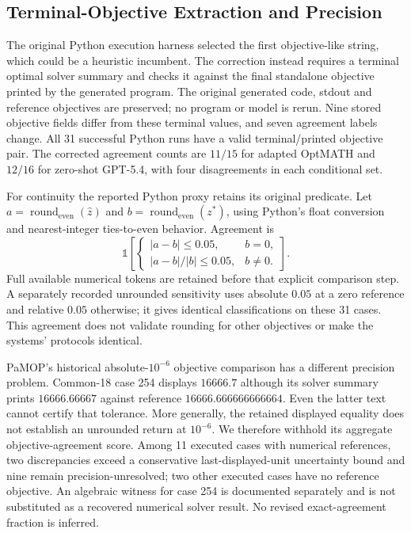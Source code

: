 \subsection{Terminal-Objective Extraction and Precision}
The original Python execution harness selected the first objective-like string, which could be a heuristic incumbent. The correction instead requires a terminal optimal solver summary and checks it against the final standalone objective printed by the generated program. The original generated code, stdout and reference objectives are preserved; no program or model is rerun. Nine stored objective fields differ from these terminal values, and seven agreement labels change. All 31 successful Python runs have a valid terminal/printed objective pair. The corrected agreement counts are $11/15$ for adapted OptMATH and $12/16$ for zero-shot GPT-5.4, with four disagreements in each conditional set.

For continuity the reported Python proxy retains its original predicate. Let $a=\operatorname{round}_{\mathrm{even}}(\hat z)$ and $b=\operatorname{round}_{\mathrm{even}}(z^*)$, using Python's float conversion and nearest-integer ties-to-even behavior. Agreement is
\begin{equation}
 \mathbb{1}\!\left[\begin{cases}|a-b|\leq0.05,&b=0,\\ |a-b|/|b|\leq0.05,&b\ne0.\end{cases}\right].
 \label{eq:common18-objective-proxy}
\end{equation}
Full available numerical tokens are retained before that explicit comparison step. A separately recorded unrounded sensitivity uses absolute $0.05$ at a zero reference and relative $0.05$ otherwise; it gives identical classifications on these 31 cases. This agreement does not validate rounding for other objectives or make the systems' protocols identical.

PaMOP's historical absolute-$10^{-6}$ objective comparison has a different precision problem. Common-18 case 254 displays $16666.7$ although its solver summary prints $16666.66667$ against reference $16666.666666666664$. Even the latter text cannot certify that tolerance. More generally, the retained displayed equality does not establish an unrounded return at $10^{-6}$. We therefore withhold its aggregate objective-agreement score. Among 11 executed cases with numerical references, two discrepancies exceed a conservative last-displayed-unit uncertainty bound and nine remain precision-unresolved; two other executed cases have no reference objective. An algebraic witness for case 254 is documented separately and is not substituted as a recovered numerical solver result. No revised exact-agreement fraction is inferred.

